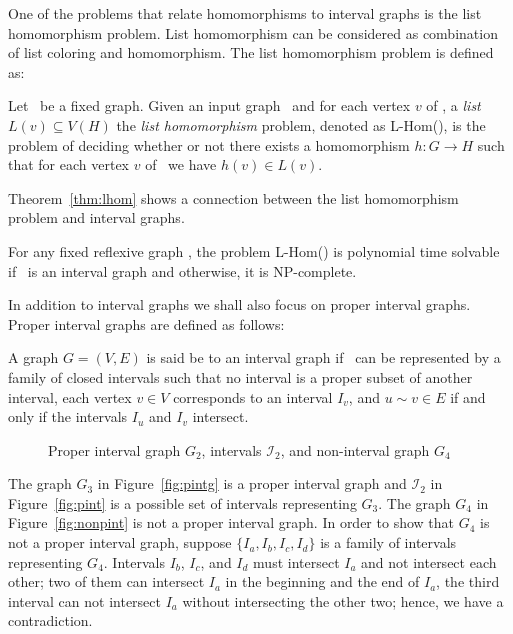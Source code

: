 One of the problems that relate homomorphisms to interval graphs is the list homomorphism problem.
List homomorphism can be considered as combination of list coloring and homomorphism.
The list homomorphism problem is defined as:

\begin{defi} [L-Hom]
Let \mH\ be a fixed graph. Given an input graph \mG\ and for each vertex \(v\) of \mG,
a \emph{list} \(L(v) \subseteq V(H)\) the \emph{list homomorphism} problem, denoted
as L-Hom(\mH), is the problem of  deciding whether or not
there exists a homomorphism \(h: G\to H\) such that for each vertex \(v\) of \mG\ 
we have \(h(v)\in L(v)\)\@.
\end{defi}

Theorem~\ref{thm:lhom} shows a connection between the list homomorphism
problem and interval graphs.

\begin{theorem} [Feder and Hell 1996 \cite{listhom}] \label{thm:lhom}
For any fixed reflexive graph \mH, the problem L-Hom(\mH) is polynomial time solvable if
\mH\ is an interval graph and otherwise, it is NP-complete.
\end{theorem}

In addition to interval graphs we shall also focus on proper interval graphs.
Proper interval graphs are defined as follows:

\begin{defi}
A graph \(G=(V,E)\) is said be to an interval graph if \mG\ can
be represented by a family of closed intervals such that
no interval is a proper subset of another interval,
each vertex \(v \in V\) corresponds to an interval \(I_v\), and \(u \sim v \in E\)
if and only if the intervals \(I_u\) and \(I_v\) intersect.
\end{defi}

\begin{figure}[h]
\hspace{1cm}
\subfigure[\ensuremath{G_3}]{\label{fig:pintg}}\hspace{2cm}
\subfigure[\ensuremath{I_2}]{\label{fig:pint}}\hspace{2cm}
\subfigure[\ensuremath{G_4}]{\label{fig:nonpint}}
\caption{Proper interval graph \ensuremath{G_2}, intervals \ensuremath{\mathcal{I}_2}, and non-interval graph \ensuremath{G_4}}\label{fig:pintgi}
\end{figure}

The graph \(G_3\) in Figure~\ref{fig:pintg} is a proper interval graph and
\(\mathcal{I}_2\) in Figure~\ref{fig:pint} is a possible set of intervals representing \(G_3\)\@.
The graph \(G_4\) in Figure~\ref{fig:nonpint} is not a proper interval graph. In order to show that
\(G_4\) is not a proper interval graph, suppose \(\{I_a, I_b, I_c, I_d\}\) is a family of intervals representing \(G_4\)\@.
Intervals \(I_b\), \(I_c\), and \(I_d\) must intersect \(I_a\) and not intersect each other; two of them can intersect \(I_a\)
in the beginning and the end of \(I_a\), the third interval can not intersect \(I_a\) without intersecting the other two; hence, we have a contradiction.

